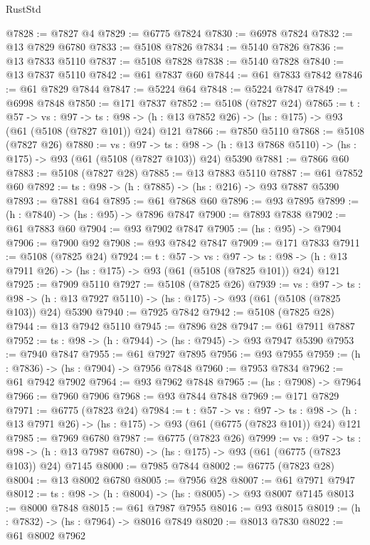 \begin{lexlean}{RustStd}
\begin{coremodule}
@7828 := @7827 @4
@7829 := @6775 @7824
@7830 := @6978 @7824
@7832 := @13 @7829 @6780
@7833 := @5108 @7826
@7834 := @5140 @7826
@7836 := @13 @7833 @5110
@7837 := @5108 @7828
@7838 := @5140 @7828
@7840 := @13 @7837 @5110
@7842 := @61 @7837 @60
@7844 := @61 @7833 @7842
@7846 := @61 @7829 @7844
@7847 := @5224 @64
@7848 := @5224 @7847
@7849 := @6998 @7848
@7850 := @171 @7837
@7852 := @5108 (@7827 @24)
@7865 := {t : @57} ->
  {vs : @97} ->
  {ts : @98} -> (h : @13 @7852 @26) -> (hs : @175) -> @93 (@61 (@5108 (@7827 @101)) @24) @121
@7866 := @7850 @5110
@7868 := @5108 (@7827 @26)
@7880 := {vs : @97} ->
  {ts : @98} -> (h : @13 @7868 @5110) -> (hs : @175) -> @93 (@61 (@5108 (@7827 @103)) @24) @5390
@7881 := @7866 @60
@7883 := @5108 (@7827 @28)
@7885 := @13 @7883 @5110
@7887 := @61 @7852 @60
@7892 := {ts : @98} -> (h : @7885) -> (hs : @216) -> @93 @7887 @5390
@7893 := @7881 @64
@7895 := @61 @7868 @60
@7896 := @93 @7895
@7899 := (h : @7840) -> (hs : @95) -> @7896 @7847
@7900 := @7893 @7838
@7902 := @61 @7883 @60
@7904 := @93 @7902 @7847
@7905 := (hs : @95) -> @7904
@7906 := @7900 @92
@7908 := @93 @7842 @7847
@7909 := @171 @7833
@7911 := @5108 (@7825 @24)
@7924 := {t : @57} ->
  {vs : @97} ->
  {ts : @98} -> (h : @13 @7911 @26) -> (hs : @175) -> @93 (@61 (@5108 (@7825 @101)) @24) @121
@7925 := @7909 @5110
@7927 := @5108 (@7825 @26)
@7939 := {vs : @97} ->
  {ts : @98} -> (h : @13 @7927 @5110) -> (hs : @175) -> @93 (@61 (@5108 (@7825 @103)) @24) @5390
@7940 := @7925 @7842
@7942 := @5108 (@7825 @28)
@7944 := @13 @7942 @5110
@7945 := @7896 @28
@7947 := @61 @7911 @7887
@7952 := {ts : @98} -> (h : @7944) -> (hs : @7945) -> @93 @7947 @5390
@7953 := @7940 @7847
@7955 := @61 @7927 @7895
@7956 := @93 @7955
@7959 := (h : @7836) -> (hs : @7904) -> @7956 @7848
@7960 := @7953 @7834
@7962 := @61 @7942 @7902
@7964 := @93 @7962 @7848
@7965 := (hs : @7908) -> @7964
@7966 := @7960 @7906
@7968 := @93 @7844 @7848
@7969 := @171 @7829
@7971 := @6775 (@7823 @24)
@7984 := {t : @57} ->
  {vs : @97} ->
  {ts : @98} -> (h : @13 @7971 @26) -> (hs : @175) -> @93 (@61 (@6775 (@7823 @101)) @24) @121
@7985 := @7969 @6780
@7987 := @6775 (@7823 @26)
@7999 := {vs : @97} ->
  {ts : @98} -> (h : @13 @7987 @6780) -> (hs : @175) -> @93 (@61 (@6775 (@7823 @103)) @24) @7145
@8000 := @7985 @7844
@8002 := @6775 (@7823 @28)
@8004 := @13 @8002 @6780
@8005 := @7956 @28
@8007 := @61 @7971 @7947
@8012 := {ts : @98} -> (h : @8004) -> (hs : @8005) -> @93 @8007 @7145
@8013 := @8000 @7848
@8015 := @61 @7987 @7955
@8016 := @93 @8015
@8019 := (h : @7832) -> (hs : @7964) -> @8016 @7849
@8020 := @8013 @7830
@8022 := @61 @8002 @7962

\end{coremodule}
\end{lexlean}
